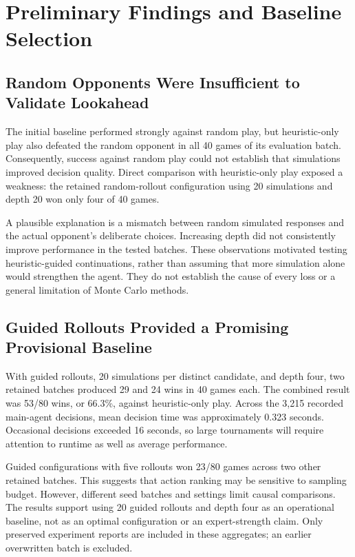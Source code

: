 \documentclass[12pt,twoside]{article}
\begin{document}
\section{Preliminary Findings and Baseline Selection}

\subsection{Random Opponents Were Insufficient to Validate Lookahead}

The initial baseline performed strongly against random play, but heuristic-only
play also defeated the random opponent in all 40 games of its evaluation batch.
Consequently, success against random play could not establish that simulations
improved decision quality. Direct comparison with heuristic-only play exposed a
weakness: the retained random-rollout configuration using 20 simulations and
depth 20 won only four of 40 games.

A plausible explanation is a mismatch between random simulated responses and
the actual opponent's deliberate choices. Increasing depth did not consistently
improve performance in the tested batches. These observations motivated testing
heuristic-guided continuations, rather than assuming that more simulation alone
would strengthen the agent. They do not establish the cause of every loss or a
general limitation of Monte Carlo methods.

\subsection{Guided Rollouts Provided a Promising Provisional Baseline}

With guided rollouts, 20 simulations per distinct candidate, and depth four,
two retained batches produced 29 and 24 wins in 40 games each. The combined
result was 53/80 wins, or 66.3\%, against heuristic-only play. Across the 3,215
recorded main-agent decisions, mean decision time was approximately 0.323 seconds.
Occasional decisions exceeded 16 seconds, so large tournaments will require
attention to runtime as well as average performance.

Guided configurations with five rollouts won 23/80 games across two other
retained batches. This suggests that action ranking may be sensitive to sampling
budget. However, different seed batches and settings limit causal comparisons.
The results support using 20 guided rollouts and depth four as an operational
baseline, not as an optimal configuration or an expert-strength claim.
Only preserved experiment reports are included in these aggregates; an earlier
overwritten batch is excluded.
\end{document}
